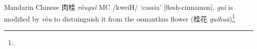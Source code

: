 \begin{etymology}\label{ety:rougui}
Mandarin Chinese {肉桂} \textit{ròuguì} \gls{MC} /kweiH/ `cassia' [flesh-cinnamon], \textit{guì} is modified by \textit{ròu} to distuinguish it from the osmanthus flower (桂花 \textit{guìhuā})\footnote{}
\end{etymology}